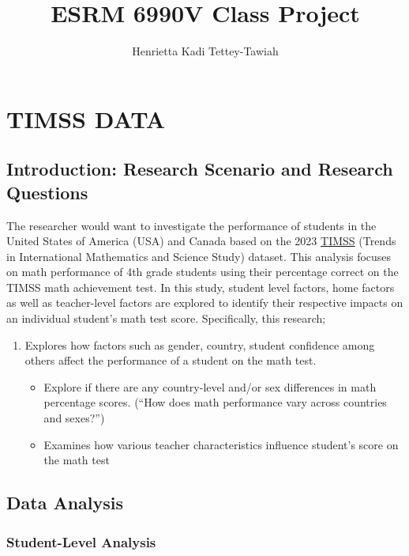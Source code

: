 \documentclass[
  letterpaper,
  DIV=11,
  numbers=noendperiod]{scrartcl}
\title{ESRM 6990V Class Project}
\author{Henrietta Kadi Tettey-Tawiah}
\date{}
\providecommand{\tightlist}{%
  \setlength{\itemsep}{0pt}\setlength{\parskip}{0pt}}\usepackage{longtable,booktabs,array}
\begin{document}
\maketitle


\section{TIMSS DATA}\label{timss-data}

\subsection{Introduction: Research Scenario and Research
Questions}\label{introduction-research-scenario-and-research-questions}

The researcher would want to investigate the performance of students in
the United States of America (USA) and Canada based on the 2023
\href{https://timss2023.org/data}{TIMSS} (Trends in International
Mathematics and Science Study) dataset. This analysis focuses on math
performance of 4th grade students using their percentage correct on the
TIMSS math achievement test. In this study, student level factors, home
factors as well as teacher-level factors are explored to identify their
respective impacts on an individual student's math test score.
Specifically, this research;

\begin{enumerate}
\def\labelenumi{\arabic{enumi}.}
\tightlist
\item
  Explores how factors such as gender, country, student confidence among
  others affect the performance of a student on the math test.

  \begin{itemize}
  \tightlist
  \item
    Explore if there are any country-level and/or sex differences in
    math percentage scores. (``How does math performance vary across
    countries and sexes?'')
  \item
    Examines how various teacher characteristics influence student's
    score on the math test
  \end{itemize}
\end{enumerate}

\subsection{Data Analysis}\label{data-analysis}

\subsubsection{Student-Level Analysis}\label{student-level-analysis}
\end{document}
